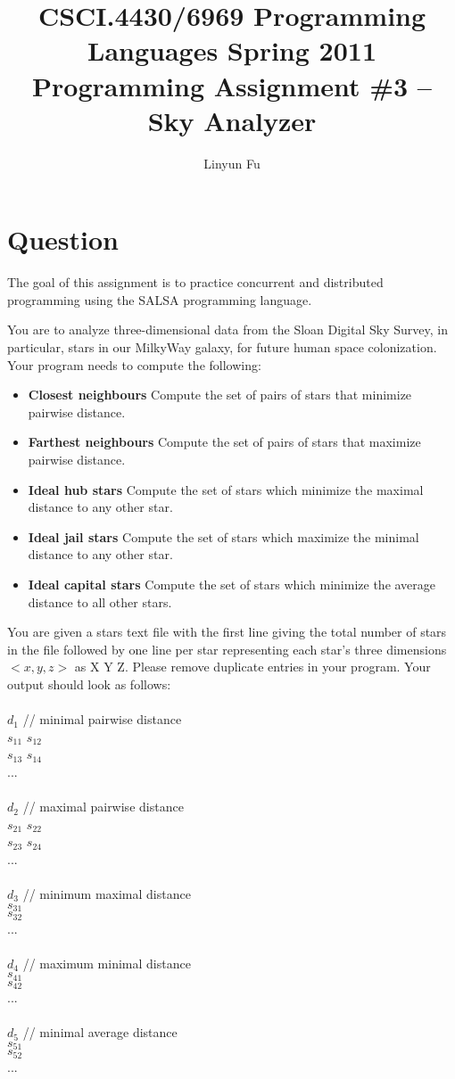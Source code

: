 \documentclass[12pt,letterpaper]{article}
\author{Linyun Fu}
\title{CSCI.4430/6969 Programming Languages Spring 2011\\
Programming Assignment \#3 -- Sky Analyzer}
\begin{document}
\maketitle
\part*{Question}
The goal of this assignment is to practice concurrent and distributed programming using the SALSA programming language. 

You are to analyze three-dimensional data from the Sloan Digital Sky Survey, in particular, stars in our MilkyWay galaxy, for future human space colonization. Your program needs to compute the following: 
\begin{itemize}
\item \textbf{Closest neighbours} Compute the set of pairs of stars that minimize pairwise distance.
\item \textbf{Farthest neighbours} Compute the set of pairs of stars that maximize pairwise distance.
\item \textbf{Ideal hub stars} Compute the set of stars which minimize the maximal distance to any other star.
\item \textbf{Ideal jail stars} Compute the set of stars which maximize the minimal distance to any other star.
\item \textbf{Ideal capital stars} Compute the set of stars which minimize the average distance to all other stars. 
\end{itemize}

You are given a stars text file with the first line giving the total number of stars in the file followed by one line per star representing each star's three dimensions $<x,y,z>$ as X Y Z. Please remove duplicate entries in your program. Your output should look as follows:\\
\\
$d_1$  // minimal pairwise distance\\
$s_{11}$ $s_{12}$\\
$s_{13}$ $s_{14}$\\
...\\
\\
$d_2$  // maximal pairwise distance\\
$s_{21}$ $s_{22}$\\
$s_{23}$ $s_{24}$\\
...\\
\\
$d_3$ // minimum maximal distance\\
$s_{31}$\\
$s_{32}$\\
...\\
\\
$d_4$ // maximum minimal distance\\
$s_{41}$\\
$s_{42}$\\
... \\
\\
$d_5$ // minimal average distance\\
$s_{51}$\\
$s_{52}$\\
...\\
\end{document}

